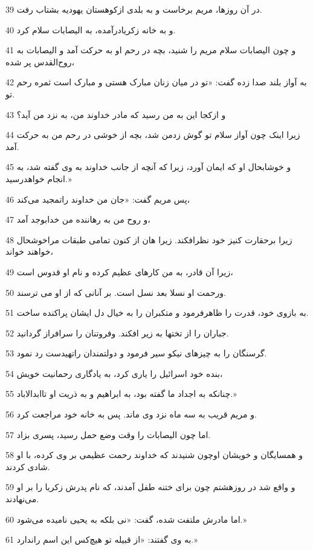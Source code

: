 \par 39 در آن روزها، مریم برخاست و به بلدی ازکوهستان یهودیه بشتاب رفت.
\par 40 و به خانه زکریادرآمده، به الیصابات سلام کرد.
\par 41 و چون الیصابات سلام مریم را شنید، بچه در رحم او به حرکت آمد و الیصابات به روح‌القدس پر شده،
\par 42 به آواز بلند صدا زده گفت: «تو در میان زنان مبارک هستی و مبارک است ثمره رحم تو.
\par 43 و ازکجا این به من رسید که مادر خداوند من، به نزد من آید؟
\par 44 زیرا اینک چون آواز سلام تو گوش زدمن شد، بچه از خوشی در رحم من به حرکت آمد.
\par 45 و خوشابحال او که ایمان آورد، زیرا که آنچه از جانب خداوند به وی گفته شد، به انجام خواهدرسید.»
\par 46 پس مریم گفت: «جان من خداوند راتمجید می‌کند،
\par 47 و روح من به رهاننده من خدابوجد آمد،
\par 48 زیرا بر‌حقارت کنیز خود نظرافکند. زیرا هان از کنون تمامی طبقات مراخوشحال خواهند خواند،
\par 49 زیرا آن قادر، به من کارهای عظیم کرده و نام او قدوس است،
\par 50 ورحمت او نسلا بعد نسل است. بر آنانی که از او می ترسند.
\par 51 به بازوی خود، قدرت را ظاهرفرمود و متکبران را به خیال دل ایشان پراکنده ساخت.
\par 52 جباران را از تختها به زیر افکند. وفروتنان را سرافراز گردانید.
\par 53 گرسنگان را به چیزهای نیکو سیر فرمود و دولتمندان راتهیدست رد نمود.
\par 54 بنده خود اسرائیل را یاری کرد، به یادگاری رحمانیت خویش،
\par 55 چنانکه به اجداد ما گفته بود، به ابراهیم و به ذریت او تاابدالاباد.»
\par 56 و مریم قریب به سه ماه نزد وی ماند. پس به خانه خود مراجعت کرد.
\par 57 اما چون الیصابات را وقت وضع حمل رسید، پسری بزاد.
\par 58 و همسایگان و خویشان اوچون شنیدند که خداوند رحمت عظیمی بر وی کرده، با او شادی کردند.
\par 59 و واقع شد در روزهشتم چون برای ختنه طفل آمدند، که نام پدرش زکریا را بر او می‌نهادند.
\par 60 اما مادرش ملتفت شده، گفت: «نی بلکه به یحیی نامیده می‌شود.»
\par 61 به وی گفتند: «از قبیله تو هیچ‌کس این اسم راندارد.»
